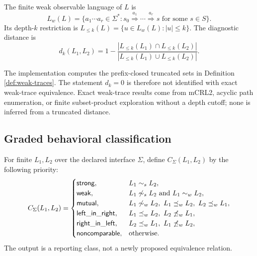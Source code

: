 \documentclass{ws-jbcb}
\numberwithin{equation}{section}
\newcommand{\xRightarrow}[1]{\stackrel{#1}{\Longrightarrow}}
\newcommand{\strongsim}{\mathrel{\sim_{s}}}
\newcommand{\weaksim}{\mathrel{\sim_{w}}}
\newcommand{\weakpre}{\mathrel{\preceq_{w}}}
\begin{document}
\begin{definition}\label{def:weak-traces}
The finite weak observable language of $L$ is
\begin{equation}\label{eq:exact-language}
 L_w(L)=\{a_1\cdots a_r\in\Sigma^*:s_0
 \xRightarrow{a_1}\cdots\xRightarrow{a_r}s
 \text{ for some }s\in S\}.
\end{equation}
Its depth-$k$ restriction is
$L_{\leq k}(L)=\{u\in L_w(L):|u|\leq k\}$. The diagnostic distance is
\begin{equation}\label{eq:distance}
d_k(L_1,L_2)=1-
\frac{|L_{\leq k}(L_1)\cap L_{\leq k}(L_2)|}
{|L_{\leq k}(L_1)\cup L_{\leq k}(L_2)|}.
\end{equation}
\end{definition}

The implementation computes the prefix-closed truncated sets in Definition
\ref{def:weak-traces}. The statement $d_k=0$ is therefore not identified with
exact weak-trace equivalence. Exact weak-trace results come from mCRL2, acyclic path enumeration,
or finite subset-product exploration without a depth cutoff; none is inferred
from a truncated distance.

\subsection{Graded behavioral classification}\label{sec:decision}

\begin{definition}\label{def:classifier}
For finite $L_1,L_2$ over the declared interface $\Sigma$, define
$C_{\Sigma}(L_1,L_2)$ by the following priority:
\begin{equation}\label{eq:classifier}
C_{\Sigma}(L_1,L_2)=
\begin{cases}
\mathsf{strong}, & L_1\strongsim L_2,\\
\mathsf{weak}, & L_1\not\strongsim L_2\text{ and }L_1\weaksim L_2,\\
\mathsf{mutual}, & L_1\not\weaksim L_2,\ L_1\weakpre L_2,\ L_2\weakpre L_1,\\
\mathsf{left\_in\_right}, & L_1\weakpre L_2,\ L_2\not\weakpre L_1,\\
\mathsf{right\_in\_left}, & L_2\weakpre L_1,\ L_1\not\weakpre L_2,\\
\mathsf{noncomparable}, & \text{otherwise}.
\end{cases}
\end{equation}
The output is a reporting class, not a newly proposed equivalence relation.
\end{definition}
\end{document}
